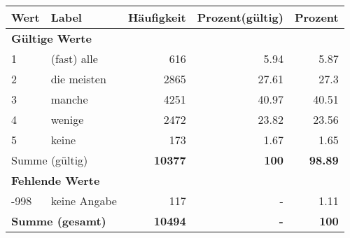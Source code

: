     \begin{longtable}{lXrrr}
     \toprule
     \textbf{Wert} & \textbf{Label} & \textbf{Häufigkeit} & \textbf{Prozent(gültig)} & \textbf{Prozent} \\
     \endhead
     \midrule
     \multicolumn{5}{l}{\textbf{Gültige Werte}}\\

     1 &
     \multicolumn{1}{X}{ (fast) alle   } &


       \num{616} &
       \num[round-mode=places,round-precision=2]{5,94} &
         \num[round-mode=places,round-precision=2]{5,87} \\

     2 &
     \multicolumn{1}{X}{ die meisten   } &


       \num{2865} &
       \num[round-mode=places,round-precision=2]{27,61} &
         \num[round-mode=places,round-precision=2]{27,3} \\

     3 &
     \multicolumn{1}{X}{ manche   } &


       \num{4251} &
       \num[round-mode=places,round-precision=2]{40,97} &
         \num[round-mode=places,round-precision=2]{40,51} \\

     4 &
     \multicolumn{1}{X}{ wenige   } &


       \num{2472} &
       \num[round-mode=places,round-precision=2]{23,82} &
         \num[round-mode=places,round-precision=2]{23,56} \\

     5 &
     \multicolumn{1}{X}{ keine   } &


       \num{173} &
       \num[round-mode=places,round-precision=2]{1,67} &
         \num[round-mode=places,round-precision=2]{1,65} \\
     \midrule
     \multicolumn{2}{l}{Summe (gültig)} &
       \textbf{\num{10377}} &
     \textbf{100} &
       \textbf{\num[round-mode=places,round-precision=2]{98,89}} \\
     \multicolumn{5}{l}{\textbf{Fehlende Werte}}\\
       -998 &
       keine Angabe &
         \num{117} &
        - &
         \num[round-mode=places,round-precision=2]{1,11} \\
     \midrule
     \multicolumn{2}{l}{\textbf{Summe (gesamt)}} &
          \textbf{\num{10494}} &
        \textbf{-} &
        \textbf{100} \\
     \bottomrule
     \end{longtable}
     
